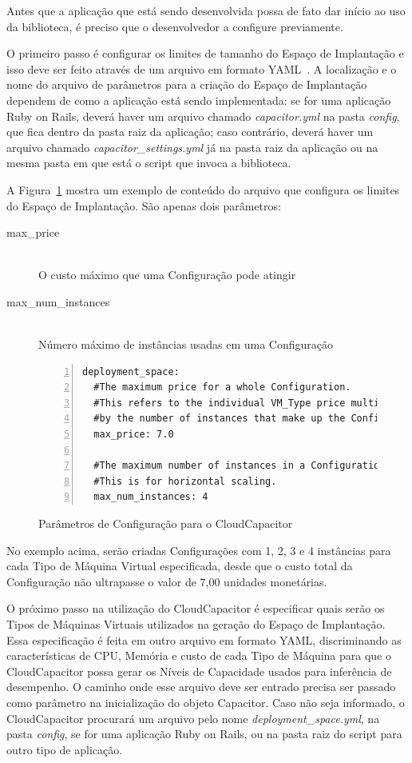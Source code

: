 Antes que a aplicação que está sendo desenvolvida possa de fato dar início ao uso 
da biblioteca, é preciso que o desenvolvedor a configure previamente. 

O primeiro passo é configurar os limites de tamanho do Espaço de Implantação e 
isso deve ser feito através de um arquivo em formato YAML~\cite{yml}. A localização 
e o nome do arquivo de parâmetros para a criação do Espaço de Implantação dependem 
de como a aplicação está sendo implementada: se for uma aplicação Ruby on Rails, 
deverá haver um arquivo chamado \emph{capacitor.yml} na pasta \emph{config}, que 
fica dentro da pasta raiz da aplicação; caso contrário, deverá haver um arquivo 
chamado \emph{capacitor\_settings.yml} já na pasta raiz da aplicação ou na mesma 
pasta em que está o script que invoca a biblioteca. 

A Figura~\ref{fig:settings} mostra um exemplo de conteúdo do arquivo que configura
os limites do Espaço de Implantação. São apenas dois parâmetros:

\begin{description}
  \item[max\_price] \hfill \\ O custo máximo que uma Configuração pode atingir
  \item[max\_num\_instances] \hfill \\ Número máximo de instâncias usadas em uma Configuração 
\end{description}

\begin{figure}[h]
  \caption{\label{fig:settings}Parâmetros de Configuração para o CloudCapacitor}
 \begin{lstlisting}[linewidth=\textwidth,xleftmargin=.04\textwidth, numbers=left]
deployment_space:
  #The maximum price for a whole Configuration.
  #This refers to the individual VM_Type price multiplied 
  #by the number of instances that make up the Configuration
  max_price: 7.0

  #The maximum number of instances in a Configuration. 
  #This is for horizontal scaling.
  max_num_instances: 4
  \end{lstlisting}
\end{figure}

No exemplo acima, serão criadas Configurações com 1, 2, 3 e 4 instâncias para cada
Tipo de Máquina Virtual especificada, desde que o custo total da Configuração não
ultrapasse o valor de 7,00 unidades monetárias.

O próximo passo na utilização do CloudCapacitor é especificar quais serão os Tipos
de Máquinas Virtuais utilizados na geração do Espaço de Implantação. Essa 
especificação é feita em outro arquivo em formato YAML, discriminando as 
características de CPU, Memória e custo de cada Tipo de Máquina para que o
CloudCapacitor possa gerar os Níveis de Capacidade usados para inferência de
desempenho. O caminho onde esse arquivo deve ser entrado precisa ser passado 
como parâmetro na inicialização do objeto Capacitor. Caso não seja informado, o 
CloudCapacitor procurará um arquivo pelo nome \emph{deployment\_space.yml}, na
pasta \emph{config}, se for uma aplicação Ruby on Rails, ou na pasta raiz do
script para outro tipo de aplicação.
 
